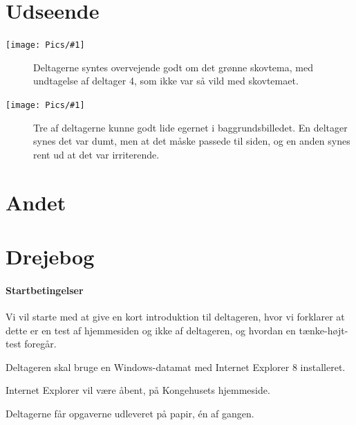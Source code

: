 \documentclass[10pt,a4paper]{article}      %
\newcommand\pic[1]{\texttt{[image: Pics/\#1]}}
\renewcommand\good{\pic{good}}
\renewcommand\smallproblem{\pic{smallproblem}}
\begin{document}
\section{Udseende}
\begin{description}
  \item[\good] Deltagerne syntes overvejende godt om det grønne skovtema, med
  undtagelse af deltager 4, som ikke var så vild med skovtemaet.

  \item[\smallproblem] Tre af deltagerne kunne godt lide egernet i baggrundsbilledet. En deltager
  synes det var dumt, men at det måske passede til siden, og en anden synes rent
  ud at det var irriterende.
\end{description}

\section{Andet}


\appendix
{}

\section{Drejebog}

\paragraph{Startbetingelser}
\begin{opgaver}
\item Vi vil starte med at give en kort introduktion til deltageren, hvor vi
forklarer at dette er en test af hjemmesiden og ikke af deltageren, og hvordan
en tænke-højt-test foregår.
\item Deltageren skal bruge en Windows-datamat med Internet Explorer 8
installeret.
\item Internet Explorer vil være åbent, på Kongehusets hjemmeside.
\item Deltagerne får opgaverne udleveret på papir, én af gangen.
\end{opgaver}
\end{document}
